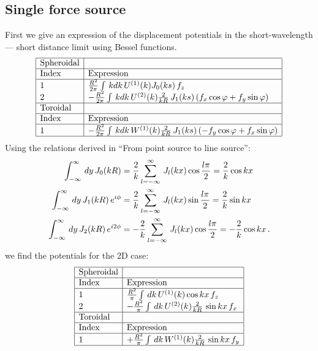 \documentclass[12pt,a4paper]{article}
\begin{document}
\subsection{Single force source}
%
First we give an expression of the displacement potentials in the short-wavelength--- short distance limit using Bessel functions. 
%
\begin{displaymath}
\begin{array}{|l|l|}\hline
\mbox{Spheroidal} & \\ \hline
\mbox{Index} & \mbox{Expression} \\ \hline
1 & \frac{R^2}{2\pi} \int\,k dk\,U^{(1)}(k) J_0(ks)\,f_z \\
2 & -\frac{R^2}{2\pi} \int\,k dk\,U^{(2)}(k)\frac{2}{kR}\,J_1(ks)\left(f_x\cos\varphi+f_y\sin\varphi\right) \\ \hline
\mbox{Toroidal} & \\ \hline
\mbox{Index} & \mbox{Expression} \\ \hline
1 & -\frac{R^2}{2\pi} \int\,k dk\,W^{(1)}(k)\frac{2}{kR}\,J_1(ks)\left(-f_y\cos\varphi+f_x\sin\varphi\right) \\ \hline
\end{array}
\end{displaymath}
%
Using the relations derived in ``From point source to line source'':
\begin{align}
\int_{-\infty}^\infty\,dy\,J_0(kR) & = \frac{2}{k}\sum_{l=-\infty}^\infty\,J_{l}(kx)\cos\frac{l\pi}{2} = \frac{2}{k}\cos kx \notag \\
\int_{-\infty}^\infty\,dy\,J_1(kR)\,e^{i\phi} & = \frac{2}{k}\sum_{l=-\infty}^\infty\,J_{l}(kx)\sin\frac{l\pi}{2} = \frac{2}{k}\sin kx \notag \\
\int_{-\infty}^\infty\,dy\,J_2(kR)\,e^{i2\phi} & = -\frac{2}{k}\sum_{l=-\infty}^\infty\,J_{l}(kx)\cos\frac{l\pi}{2} = -\frac{2}{k}\cos kx\,.  \notag
\end{align}
%
we find the potentials for the 2D case:
%
\begin{displaymath}
\begin{array}{|l|l|}\hline
\mbox{Spheroidal} & \\ \hline
\mbox{Index} & \mbox{Expression} \\ \hline
1 & \frac{R^2}{\pi} \int\,dk\,U^{(1)}(k) \cos kx\,f_z \\
2 & -\frac{R^2}{\pi} \int\,dk\,U^{(2)}(k)\frac{2}{kR}\,\sin kx\,f_x \\ \hline
\mbox{Toroidal} & \\ \hline
\mbox{Index} & \mbox{Expression} \\ \hline
1 & +\frac{R^2}{\pi} \int\,dk\,W^{(1)}(k)\frac{2}{kR}\,\sin kx\,f_y \\ \hline
\end{array}
\end{displaymath}
\end{document}
